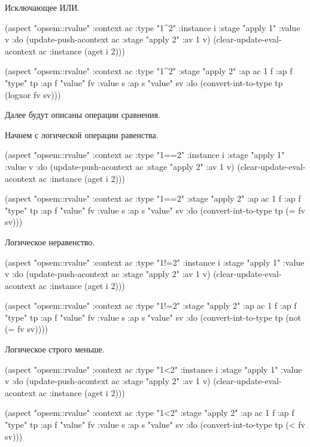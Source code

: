 \documentclass[12pt,twoside,russian]{article}
\begin{document}
Исключающее ИЛИ.

\begin{ABMLCode}
(aspect "opsem::rvalue" :context ac :type "1^2" :instance i 
  :stage "apply 1" :value v :do 
  (update-push-acontext ac :stage "apply 2" :av 1 v)
  (clear-update-eval-acontext ac :instance (aget i 2)))

(aspect "opsem::rvalue" :context ac :type "1^2" :stage "apply 2" 
  :ap ac 1 f :ap f "type" tp :ap f "value" fv :value s 
  :ap s "value" sv :do 
  (convert-int-to-type tp (logxor fv sv)))
\end{ABMLCode}

Далее будут описаны операции сравнения.

Начнем с логической операции равенства.

\begin{ABMLCode}
(aspect "opsem::rvalue" :context ac :type "1==2" :instance i 
  :stage "apply 1" :value v :do 
  (update-push-acontext ac :stage "apply 2" :av 1 v)
  (clear-update-eval-acontext ac :instance (aget i 2)))

(aspect "opsem::rvalue" :context ac :type "1==2" :stage "apply 2" 
    :ap ac 1 f :ap f "type" tp :ap f "value" fv :value s 
    :ap s "value" sv :do 
    (convert-int-to-type tp (= fv sv)))
\end{ABMLCode}

Логическое неравенство.

\begin{ABMLCode}
(aspect "opsem::rvalue" :context ac :type "1!=2" :instance i 
  :stage "apply 1" :value v :do 
  (update-push-acontext ac :stage "apply 2" :av 1 v)
  (clear-update-eval-acontext ac :instance (aget i 2)))

(aspect "opsem::rvalue" :context ac :type "1!=2" :stage "apply 2" 
    :ap ac 1 f :ap f "type" tp :ap f "value" fv :value s 
    :ap s "value" sv :do 
    (convert-int-to-type tp (not (= fv sv))))
\end{ABMLCode}

Логическое строго меньше.

\begin{ABMLCode}
(aspect "opsem::rvalue" :context ac :type "1<2" :instance i 
  :stage "apply 1" :value v :do 
  (update-push-acontext ac :stage "apply 2" :av 1 v)
  (clear-update-eval-acontext ac :instance (aget i 2)))

(aspect "opsem::rvalue" :context ac :type "1<2" :stage "apply 2" 
    :ap ac 1 f :ap f "type" tp :ap f "value" fv :value s 
    :ap s "value" sv :do 
    (convert-int-to-type tp (< fv sv)))
\end{ABMLCode}
\end{document}
